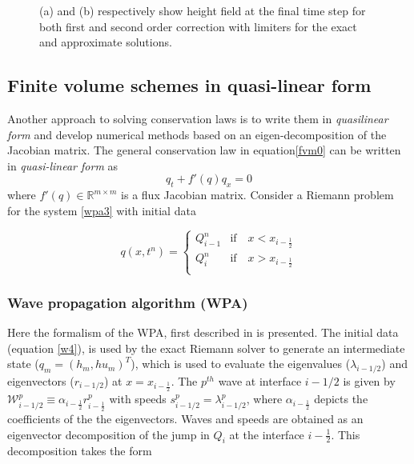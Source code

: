 \documentclass[10pt,a4paper]{article}
\begin{document}
\begin{figure}[H]
\begin{subfigure}[b]{0.5\textwidth}
			\caption{}
			\label{fig:exapp}
		\end{subfigure}
		\caption{(a) and (b) respectively show height field at the final time step for both first and second order correction with limiters for the exact and approximate solutions.}
	\end{figure}


	\subsection{Finite volume schemes in quasi-linear form}
	Another approach to solving conservation laws is to write  them in  {\em quasilinear form} and develop numerical methods based on an eigen-decomposition of the Jacobian matrix. The general conservation law in equation\eqref{fvm0} can be written in {\em quasi-linear form}
as
\begin{equation}
	q_{t} + f'(q)q_{x} = 0
	\label{wpa3}
\end{equation}
where  $f'(q) \in \mathbb{R}^{m\times m}$  is a flux Jacobian matrix.  Consider a Riemann problem for the system  \eqref{wpa3} with initial data 

\begin{equation}
	q(x,t^n)  = \begin{cases}
		Q_{i-1}^{n}  & \text{if} \quad  x < x_{i-\frac{1}{2}}\\
		Q_{i}^{n} & \text{if} \quad x > x_{i-\frac{1}{2}}\\
	\end{cases}    
	\label{w4}   
\end{equation}
\subsubsection{Wave propagation algorithm (WPA)}
 Here the formalism of the WPA, first described in \cite{le:1997} is presented.   The initial data (equation \eqref{w4}), is used by the exact Riemann solver to generate an intermediate state ($q_m = (h_m, hu_m)^T$), which is used to evaluate the eigenvalues ($\lambda_{i-1/2}$) and eigenvectors ($r_{i-1/2}$) at $x = x_{i-\frac{1}{2}}$. The $p^{th}$ wave at interface $i-1/2$ is given by $\mathcal W^p_{i-1/2} \equiv \alpha_{i-\frac{1}{2}} r^p_{i-\frac{1}{2}}$ with speeds $s^p_{i-1/2} = \lambda^p_{i-1/2}$, where $ \alpha_{i-\frac{1}{2}}$ depicts the coefficients of the the eigenvectors.  Waves and speeds are obtained as an eigenvector decomposition of the jump in $Q_i$ at the interface $i-\frac{1}{2}$.  This decomposition takes the form
\end{document}
